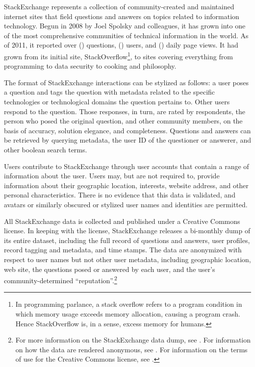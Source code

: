 \documentclass[11pt]{article}
\begin{document}
StackExchange represents a collection of community-created and
maintained internet sites that field questions and answers on topics related to information
technology. Begun in 2008 by Joel Spolsky and colleagues, it has grown
into one of the most comprehensive communities of technical
information in the world. As of 2011, it reported over () questions,
() users, and () daily page views. It had grown from its initial site,
StackOverflow\footnote{In programming parlance, a stack overflow
  refers to a program condition in which memory usage exceeds
  memory allocation, causing a program crash. Hence StackOverflow is,
  in a sense, excess memory for humans.}, to sites covering everything
from programming to data security to cooking and philosophy. 

The format of StackExchange interactions can be stylized as follows: a
user poses a question and tags the question with metadata related to
the specific technologies or technological domains the question
pertains to. Other users respond to the question. Those responses, in
turn, are rated by respondents, the person who posed the original
question, and other community members, on the basis of accuracy,
solution elegance, and completeness. Questions and answers can be
retrieved by querying metadata, the user ID of the questioner or
answerer, and other boolean search terms. 

Users contribute to StackExchange through user accounts that contain a
range of information about the user. Users may, but are not required
to, provide information about their geographic location, interests,
website address, and other personal characteristics. There is no
evidence that this data is validated, and avatars or similarly
obscured or stylized user names and identities are permitted. 


All StackExchange data is collected and published under a Creative
Commons license. In keeping with the license, StackExchange releases
a bi-monthly dump of its entire dataset, including the full record of
questions and answers, user profiles, record tagging and metadata, and
time stamps. The data are anonymized with respect to user names but
not other user metadata, including geographic location, web site,
the questions posed or answered by each user, and the
user's community-determined ``reputation''.\footnote{For more
  information on the StackExchange data dump, see \url{}. For information
  on how the data are rendered anonymous, see \url{}. For information
  on the terms of use for the Creative Commons license, see \url{}.}
\end{document}
